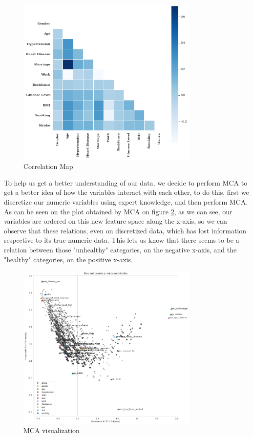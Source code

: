 \documentclass[11pt, a4paper]{article}
\begin{document}
\begin{figure}[H]
    \centering
    \includegraphics[width=0.8\textwidth]{images/Correlation.png}
    \caption{Correlation Map}
    \label{fig:Correlation}
\end{figure}


To help us get a better understanding of our data, we decide to perform MCA to get a better idea of how the variables interact with each other, to do this, first we discretize our numeric variables using expert knowledge, and then perform MCA. As can be seen on the plot obtained by MCA on figure \ref{fig:mca}, as we can see, our variables are ordered on this new feature space along the x-axis, so we can observe that these relations, even on discretized data, which has lost information respective to its true numeric data. This lets us know that there seems to be a relation between those "unhealthy" categories, on the negative x-axis, and the "healthy" categories, on the positive x-axis. 

\begin{figure}[H]
    \centering
    \includegraphics[width=0.8\textwidth]{images/MCA.png}
    \caption{MCA visualization}
    \label{fig:mca}
\end{figure}
\end{document}
